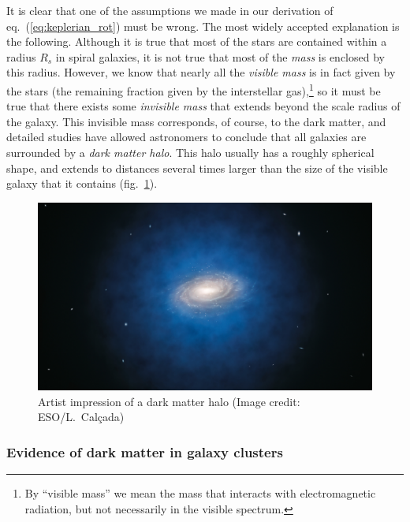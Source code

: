 It is clear that one of the assumptions we made in our derivation of eq.\ (\ref{eq:keplerian_rot}) must be wrong. The most widely accepted explanation is the following. Although it is true that most of the stars are contained within a radius $R_s$ in spiral galaxies, it is not true that most of the {\it mass} is enclosed by this radius. However, we know that nearly all the {\it visible mass} is in fact given by the stars (the remaining fraction given by the interstellar gas),\footnote{By ``visible mass'' we mean the mass that interacts with electromagnetic radiation, but not necessarily in the visible spectrum.} so it must be true that there exists some {\it invisible mass} that extends beyond the scale radius of the galaxy. This invisible mass corresponds, of course, to the dark matter, and detailed studies have allowed astronomers to conclude that all galaxies are surrounded by a {\it dark matter halo}. This halo usually has a roughly spherical shape, and extends to distances several times larger than the 
size of the visible galaxy that it contains (fig.\ \ref{fig:lec10_5}).
\begin{figure}[ht]
\begin{center}
\includegraphics[scale=0.4]{Draw/lec10_5.png}
\end{center}
\caption{Artist impression of a dark matter halo (Image credit: ESO/L.\ Cal\c{c}ada)}
\label{fig:lec10_5}
\end{figure}

\subsubsection{Evidence of dark matter in galaxy clusters}

